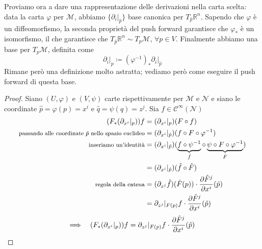 Proviamo ora a dare una rappresentazione delle derivazioni nella carta scelta: data la carta $\varphi$ per $\mathcal{M}$, abbiamo $\{ \left.\partial_i \right|_{\hat p} \}$ base canonica per $T_{\hat p}\mathbb{R}^n$.
Sapendo che $\varphi$ è un diffeomorfismo, la seconda proprietà del push forward garantisce che $\varphi_*$ è un isomorfismo, il che garantisce che $T_{\hat p}\mathbb{R}^n \sim T_p\mathcal{M}$, $\forall p \in V$.
Finalmente abbiamo una base per $T_p\mathcal{M}$, definita come
\begin{equation}
    \left.\partial_i \right|_{p} \coloneqq (\varphi^{-1} )_* \left.\partial_i \right|_{\hat p}
\end{equation}
Rimane però una definizione molto astratta; vediamo però come eseguire il push forward di questa base.
\begin{proof}
    Siano $(U, \varphi)$ e $(V, \psi)$ carte rispettivamente per $\mathcal{M}$ e $\mathcal{N}$ e siano le coordinate $\hat p = \varphi(p) = x^i$ e $\hat q = \psi(q) = z^j$.
    Sia $f \in \mathcal{C}^\infty (\mathcal{N})$
    \begin{align*}
        (F_*(\partial_{x^i}|_p))f
         & =
        (\partial_{x^i}|_p)(F \circ f)                                                                                                       \\
        \text{\footnotesize{passando alle coordinate $\hat p$ nello spazio euclideo}}
         & =
        (\partial_{x^i}|_{\hat{p}})(f \circ F \circ \varphi^{-1})                                                                            \\
        \text{\footnotesize{inseriamo un'identità}}
         & =
        (\partial_{x^i}|_{\hat{p}})( \underbrace{f \circ \psi^{-1}}_{\hat{f}} \circ \underbrace{\psi \circ F \circ \varphi^{-1}}_{\hat{F}} ) \\
         & = (\partial_{x^i}|_{\hat{p}})(\hat f \circ \hat F)                                                                                \\
        \text{\footnotesize{regola della catena}}
         & =
        (\partial_{z^j} \hat{f})(\hat{F}(p)) \cdot \pdv{\hat{F}^j}{x^i}(\hat{p})                                                             \\
         & = \partial_{z^j}|_{F(p)} f \cdot \pdv{\hat{F}^j}{x^i}(\hat{p})
    \end{align*}
    \begin{equation}
        \Longrightarrow \quad (F_*(\partial_{x^i}|_p))f = \partial_{z^j}|_{F(p)} f \cdot \pdv{\hat{F}^j}{x^i}(\hat{p})
    \end{equation}
\end{proof}
